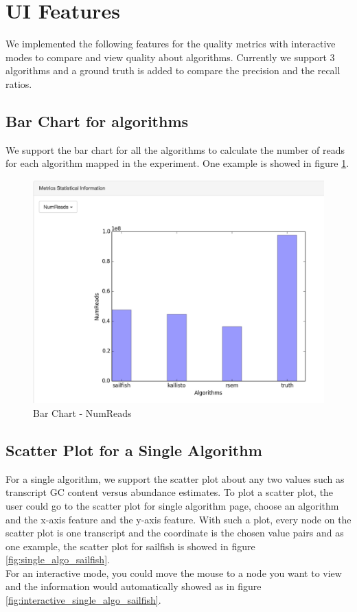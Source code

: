 \documentclass[11pt,letter]{article}
\begin{document}
\section {UI Features}
We implemented the following features for the quality metrics with interactive modes to compare and view quality about algorithms. Currently we support 3 algorithms and a ground truth is added to compare the precision and the recall ratios.
\subsection {Bar Chart for algorithms}
We support the bar chart for all the algorithms to calculate the number of reads for each algorithm mapped in the experiment. One example is showed in figure \ref{fig:barchart_numreads}.

\begin{figure}
 \centering
 \includegraphics[width=.6\linewidth]{./fig/barchar_numreads.jpg}
 \caption{Bar Chart - NumReads}
  \label{fig:barchart_numreads}
\end{figure}

\subsection {Scatter Plot for a Single Algorithm}
For a single algorithm, we support the scatter plot about any two values such as transcript GC content versus abundance estimates. To plot a scatter plot, the user could go to the scatter plot for single algorithm page, choose an algorithm and the x-axis feature and the y-axis feature. With such a plot, every node on the scatter plot is one transcript and the coordinate is the chosen value pairs and as one example, the scatter plot for sailfish is showed in figure \ref{fig:single_algo_sailfish}. \\
For an interactive mode, you could move the mouse to a node you want to view and the information would automatically showed as in figure \ref{fig:interactive_single_algo_sailfish}.
\end{document}
